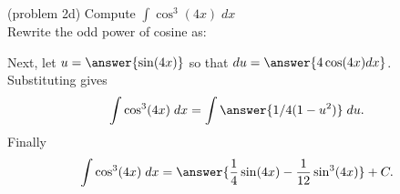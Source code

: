 \documentclass{ximera}
\begin{document}
\begin{problem}{\color{gray}(problem 2d)}
Compute $\displaystyle{\int \cos^3(4x) \; dx}$\\

Rewrite the odd power of cosine as:
\begin{multipleChoice}
\end{multipleChoice}

Next, let $u = \answer{\sin(4x)}$ so that $du = \answer{4\cos(4x) dx}$.\\
Substituting gives
\[
\int \cos^3(4x) \; dx= \int \answer{1/4 (1-u^2)} \; du.
\]
Finally
\[
\int \cos^3(4x) \; dx= \answer{\frac14 \sin(4x) - \frac{1}{12} \sin^3(4x) } + C.
\]
\end{problem}





\end{document}
